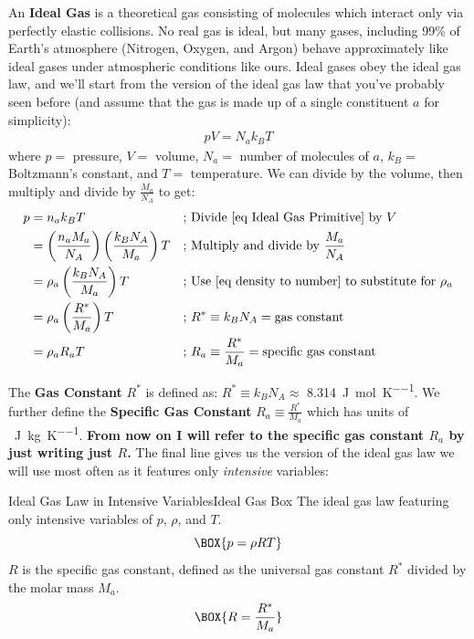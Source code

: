 An \textbf{Ideal Gas} is a theoretical gas consisting of molecules which interact only via perfectly elastic collisions. No real gas is ideal, but many gases, including 99\% of Earth's atmosphere (Nitrogen, Oxygen, and Argon) behave approximately like ideal gases under atmospheric conditions like ours. Ideal gases obey the ideal gas law, and we'll start from the version of the ideal gas law that you've probably seen before (and assume that the gas is made up of a single constituent \(a\) for simplicity):
\begin{align}\label{eq Ideal Gas Primitive}
    \boxed{pV=N_ak_BT}
\end{align}
where \(p=\) pressure, \(V=\) volume, \(N_a=\) number of molecules of \(a\), \(k_B=\) Boltzmann's constant, and \(T=\) temperature. We can divide by the volume, then multiply and divide by \(\frac{M_a}{N_A}\) to get: 
\begin{align*}
    p&=n_ak_BT & \text{; }&\text{Divide \ref{eq Ideal Gas Primitive} by }V\\
    &=\left(\frac{n_aM_a}{N_A}\right)\left(\frac{k_BN_A}{M_a}\right)T&\text{; }&\text{Multiply and divide by }\frac{M_a}{N_A}\\
    &=\rho_a\left(\frac{k_BN_A}{M_a}\right)T & \text{; }& \text{Use \ref{eq density to number} to substitute for }\rho_a\\
    &=\rho_a\left(\frac{R^*}{M_a}\right)T
    &\text{; }&R^*\equiv k_BN_A=\text{gas constant}\\
    &=\rho_aR_aT
    &\text{; }&R_a\equiv\frac{R^*}{M_a}=\text{specific gas constant}
\end{align*}

The \textbf{Gas Constant} \(R^*\) is defined as: \(R^*\equiv k_BN_A\approx\) \qty{8.314}{\joule\per\mole\per\kelvin}. We further define the \textbf{Specific Gas Constant} \(R_a\equiv \frac{R^*}{M_a}\) which has units of \qty{}{\joule\per\kilogram\per\kelvin}. \textbf{From now on I will refer to the specific gas constant \(R_a\) by just writing just \(R\).} The final line gives us the version of the ideal gas law we will use most often as it features only \textit{intensive} variables:
\begin{fact}{Ideal Gas Law in Intensive Variables}{Ideal Gas Box}\label{b Ideal Gas}
The ideal gas law featuring only intensive variables of \(p\), \(\rho\), and \(T\).
    \begin{equation}\label{eq Ideal Gas}
    \BOX{
        p=\rho RT
    }
    \end{equation}
 \(R\) is the specific gas constant, defined as the universal gas constant \(R^*\) divided by the molar mass \(M_a\).
    \begin{equation}\label{eq Specific Gas Constant}
    \BOX{
        R=\frac{R^*}{M_a}
    }
    \end{equation}
\end{fact}

